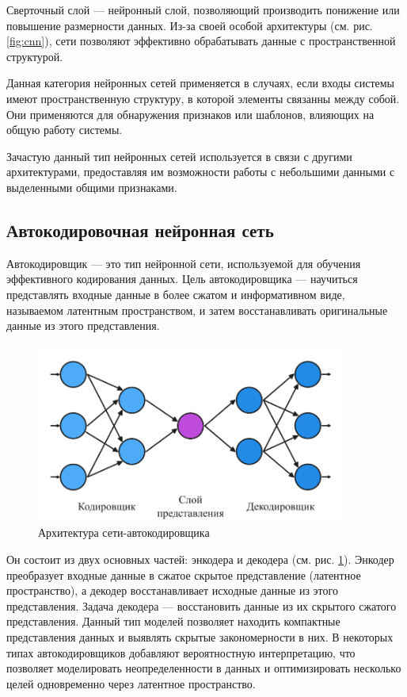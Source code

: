 Сверточный слой — нейронный слой, позволяющий производить понижение или
повышение размерности данных. Из-за своей особой архитектуры (см. рис.
\ref{fig:cnn}), сети позволяют эффективно обрабатывать данные с пространственной
структурой.

Данная категория нейронных сетей применяется в случаях, если входы системы имеют
пространственную структуру, в которой элементы связанны между собой. Они
применяются для обнаружения признаков или шаблонов, влияющих на общую работу
системы.

Зачастую данный тип нейронных сетей используется в связи с другими
архитектурами, предоставляя им возможности работы с небольшими данными с
выделенными общими признаками.

\subsection{Автокодировочная нейронная сеть}

Автокодировщик — это тип нейронной сети, используемой для обучения эффективного
кодирования данных. Цель автокодировщика — научиться представлять входные данные
в более сжатом и информативном виде, называемом латентным пространством, и затем
восстанавливать оригинальные данные из этого представления. 
\begin{figure}[H]
  \centering
    \includegraphics[width=0.9\textwidth]{figures/arch_autoencoder.png}
  \caption{Архитектура сети-автокодировщика}\label{fig:autoencoder}
\end{figure}

Он состоит из двух основных частей: энкодера и декодера (см. рис.
\ref{fig:autoencoder}). Энкодер преобразует входные данные в сжатое скрытое
представление (латентное пространство), а декодер восстанавливает исходные
данные из этого представления. Задача декодера — восстановить данные из их
скрытого сжатого представления. Данный тип моделей позволяет находить компактные
представления данных и выявлять скрытые закономерности в них. В некоторых типах
автокодировщиков добавляют вероятностную интерпретацию, что позволяет
моделировать неопределенности в данных и оптимизировать несколько целей
одновременно через латентное пространство.

